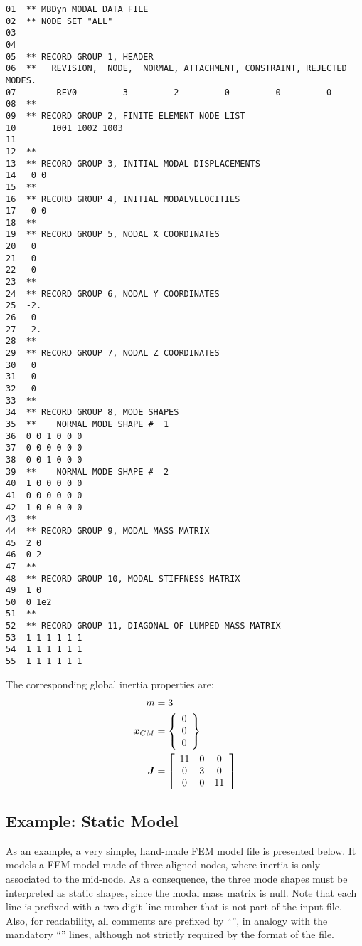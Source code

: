 {\small
\begin{verbatim}
01  ** MBDyn MODAL DATA FILE
02  ** NODE SET "ALL" 
03    
04    
05  ** RECORD GROUP 1, HEADER
06  **   REVISION,  NODE,  NORMAL, ATTACHMENT, CONSTRAINT, REJECTED MODES.
07        REV0         3         2         0         0         0
08  **
09  ** RECORD GROUP 2, FINITE ELEMENT NODE LIST
10       1001 1002 1003
11  
12  **
13  ** RECORD GROUP 3, INITIAL MODAL DISPLACEMENTS
14   0 0
15  **
16  ** RECORD GROUP 4, INITIAL MODALVELOCITIES
17   0 0
18  **
19  ** RECORD GROUP 5, NODAL X COORDINATES
20   0
21   0
22   0
23  **
24  ** RECORD GROUP 6, NODAL Y COORDINATES
25  -2.
26   0
27   2.
28  **
29  ** RECORD GROUP 7, NODAL Z COORDINATES
30   0
31   0
32   0
33  **
34  ** RECORD GROUP 8, MODE SHAPES
35  **    NORMAL MODE SHAPE #  1
36  0 0 1 0 0 0
37  0 0 0 0 0 0
38  0 0 1 0 0 0
39  **    NORMAL MODE SHAPE #  2
40  1 0 0 0 0 0
41  0 0 0 0 0 0
42  1 0 0 0 0 0
43  **
44  ** RECORD GROUP 9, MODAL MASS MATRIX
45  2 0
46  0 2
47  **
48  ** RECORD GROUP 10, MODAL STIFFNESS MATRIX
49  1 0
50  0 1e2
51  **
52  ** RECORD GROUP 11, DIAGONAL OF LUMPED MASS MATRIX
53  1 1 1 1 1 1
54  1 1 1 1 1 1
55  1 1 1 1 1 1
\end{verbatim}
}

The corresponding global inertia properties are:
\begin{align}
	m		&= 3 \\
	\T{x}_{CM}	&= \cubr{\cvvect{
		0 \\
		0 \\
		0
	}} \\
	\T{J}		&= \sqbr{\matr{ccc}{
		11 &  0 &  0 \\
		 0 &  3 &  0 \\
		 0 &  0 & 11
	}}
\end{align}


\subsection{Example: Static Model}
As an example, a very simple, hand-made FEM model file is presented below.
It models a FEM model made of three aligned nodes, where inertia 
is only associated to the mid-node.
As a consequence, the three mode shapes must be interpreted as static
shapes, since the modal mass matrix is null.
Note that each line is prefixed with a two-digit line number 
that is not part of the input file.
Also, for readability, all comments are prefixed by ``\kw{**}'', in analogy
with the mandatory ``'' lines, although not strictly 
required by the format of the file.

